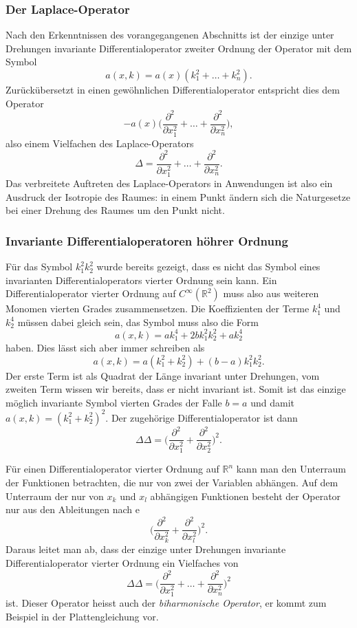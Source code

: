 %
%
\subsubsection{Der Laplace-Operator}
Nach den Erkenntnissen des vorangegangenen Abschnitts ist der einzige
unter Drehungen invariante Differentialoperator zweiter Ordnung der 
Operator mit dem Symbol
\[
a(x,k) 
=
a(x)(k_1^2+\dots+k_n^2).
\]
Zurückübersetzt in einen gewöhnlichen Differentialoperator entspricht
dies dem Operator
\[
-a(x)
\biggl(
\frac{\partial^2}{\partial x_1^2}
+
\dots
+
\frac{\partial^2}{\partial x_n^2}
\biggr)
,
\]
also einem Vielfachen des Laplace-Operators
\[
\Delta
=
\frac{\partial^2}{\partial x_1^2}
+
\dots
+
\frac{\partial^2}{\partial x_n^2}.
\]
Das verbreitete Auftreten des Laplace-Operators in Anwendungen ist
also ein Ausdruck der Isotropie des Raumes: in einem Punkt ändern sich
die Naturgesetze bei einer Drehung des Raumes um den Punkt nicht.

%
%
\subsubsection{Invariante Differentialoperatoren höhrer Ordnung}
Für das Symbol $k_1^2k_2^2$ wurde bereits gezeigt, dass es nicht das Symbol
eines invarianten Differentialoperators vierter Ordnung sein kann.
Ein Differentialoperator vierter Ordnung auf $C^\infty(\mathbb{R}^2)$
muss also aus weiteren Monomen vierten Grades zusammensetzen.
Die Koeffizienten der Terme $k_1^4$ und $k_2^4$ müssen dabei gleich
sein, das Symbol muss also die Form
\[
a(x,k)
=
ak_1^4 + 2bk_1^2k_2^2 + ak_2^4
\]
haben.
Dies lässt sich aber immer schreiben als
\[
a(x,k)
=
a(k_1^2+k_2^2) + (b-a)k_1^2k_2^2.
\]
Der erste Term ist als Quadrat der Länge invariant unter Drehungen,
vom zweiten Term wissen wir bereits, dass er nicht invariant ist.
Somit ist das einzige möglich invariante Symbol vierten Grades
der Falle $b=a$ und damit  $a(x,k) = (k_1^2+k_2^2)^2$.
Der zugehörige Differentialoperator ist dann 
\[
\Delta \Delta
=
\biggl(
\frac{\partial^2}{\partial x_1^2}
+
\frac{\partial^2}{\partial x_2^2}
\biggr)^2.
\]

Für einen Differentialoperator vierter Ordnung auf $\mathbb{R}^n$ kann
man den Unterraum der Funktionen betrachten, die nur von zwei der
Variablen abhängen.
Auf dem Unterraum der nur von $x_k$ und $x_l$ abhängigen Funktionen
besteht der Operator nur aus den Ableitungen
nach e
\[
\biggl(
\frac{\partial^2}{\partial x_k^2}
+
\frac{\partial^2}{\partial x_l^2}
\biggr)^2.
\]
Daraus leitet man ab, dass der einzige unter Drehungen invariante
Differentialoperator vierter Ordnung ein Vielfaches von
\[
\Delta\Delta 
=
\biggl(
\frac{\partial^2}{\partial x_1^2}
+
\dots
+
\frac{\partial^2}{\partial x_n^2}
\biggr)^2
\]
ist.
Dieser Operator heisst auch der {\em biharmonische Operator}, er
kommt zum Beispiel in der Plattengleichung vor.

